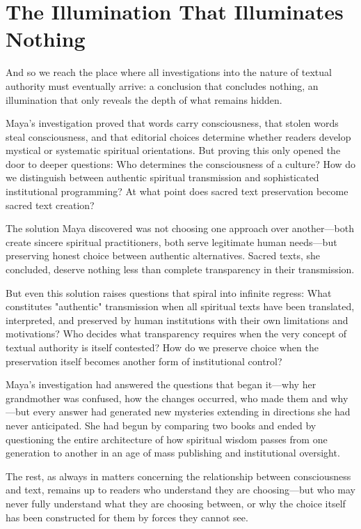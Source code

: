 \documentclass[11pt,twoside]{book}
\begin{document}
\section*{The Illumination That Illuminates Nothing}
\label{sec:orga6cfa97}

And so we reach the place where all investigations into the nature of textual authority must eventually arrive: a conclusion that concludes nothing, an illumination that only reveals the depth of what remains hidden.

Maya's investigation proved that words carry consciousness, that stolen words steal consciousness, and that editorial choices determine whether readers develop mystical or systematic spiritual orientations. But proving this only opened the door to deeper questions: Who determines the consciousness of a culture? How do we distinguish between authentic spiritual transmission and sophisticated institutional programming? At what point does sacred text preservation become sacred text creation?

The solution Maya discovered was not choosing one approach over another—both create sincere spiritual practitioners, both serve legitimate human needs—but preserving honest choice between authentic alternatives. Sacred texts, she concluded, deserve nothing less than complete transparency in their transmission.

But even this solution raises questions that spiral into infinite regress: What constitutes "authentic" transmission when all spiritual texts have been translated, interpreted, and preserved by human institutions with their own limitations and motivations? Who decides what transparency requires when the very concept of textual authority is itself contested? How do we preserve choice when the preservation itself becomes another form of institutional control?

Maya's investigation had answered the questions that began it—why her grandmother was confused, how the changes occurred, who made them and why—but every answer had generated new mysteries extending in directions she had never anticipated. She had begun by comparing two books and ended by questioning the entire architecture of how spiritual wisdom passes from one generation to another in an age of mass publishing and institutional oversight.

The rest, as always in matters concerning the relationship between consciousness and text, remains up to readers who understand they are choosing—but who may never fully understand what they are choosing between, or why the choice itself has been constructed for them by forces they cannot see.
\end{document}
